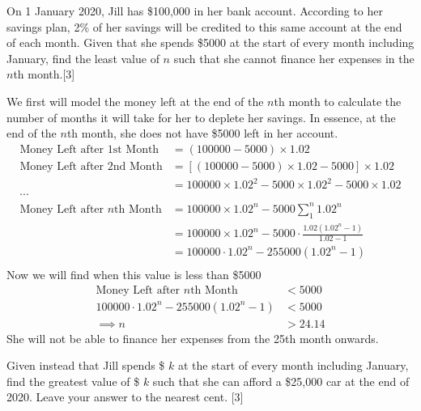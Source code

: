 \documentclass[12pt, a4 paper]{article}
\begin{document}
\begin{outline}[enumerate]
 \1 On 1 January 2020, Jill has \$100,000 in her bank account. According to her savings plan, 2\% of her savings will be credited to this same account at the end of each month. %
 \2 Given that she spends \$5000 at the start of every month including January, find the least value of \(n\) such that she cannot finance her expenses in the \(n\)th month.\hfill[3]
 \begin{answer}
  We first will model the money left at the end of the \(n\)th month to calculate the number of months it will take for her to deplete her savings. In essence, at the end of the \(n\)th month, she does not have \$5000 left in her account.
  \begin{align*}
   \textrm{Money Left after 1st Month}     & =(100000 - 5000)\times1.02                                          \\
   \textrm{Money Left after 2nd Month}     & = [(100000-5000)\times1.02-5000]\times1.02                          \\
                                           & = 100000 \times 1.02^2 - 5000 \times 1.02^2 - 5000\times1.02        \\
   \cdots                                                                                                        \\
   \textrm{Money Left after \(n\)th Month} & = 100000 \times 1.02^n - 5000\sum_1^n{1.02^n}                       \\
                                           & = 100000 \times 1.02^n - 5000 \cdot \frac{1.02(1.02^{n}-1)}{1.02-1} \\
                                           & = 100000 \cdot 1.02^n - 255000(1.02^{n}-1)                          \\
  \end{align*}
  Now we will find when this value is less than \$5000
  \begin{align*}
   \textrm{Money Left after \(n\)th Month}  & < 5000  \\
   100000 \cdot 1.02^n - 255000(1.02^{n}-1) & < 5000  \\
   \implies n                               & > 24.14
  \end{align*}
  She will not be able to finance her expenses from the 25th month onwards.
 \end{answer}
 \2 Given instead that Jill spends \$ \(k\) at the start of every month including January, find the greatest value of \$ \(k\) such that she can afford a \$25,000 car at the end of 2020. Leave your answer to the nearest cent. \hfill[3]

\end{outline}
\end{document}
